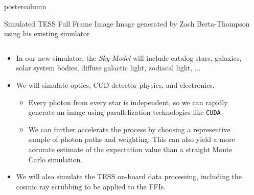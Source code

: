 \documentclass[final,hyperref={pdfpagelabels=false}]{beamer}
\newlength{\columnheight}
\begin{document}
\begin{frame}
\begin{columns}
    \begin{column}{.49\textwidth}
      \begin{beamercolorbox}[center,wd=\textwidth]{postercolumn}
        \begin{minipage}[T]{.95\textwidth}
          \parbox[t][\columnheight]{\textwidth}{
            \begin{block}{Simulated TESS Full Frame Image}
            Image generated by Zach Berta-Thompson using his existing simulator
              \begin{columns}
                \begin{column}{.60\textwidth}
                \begin{itemize}
                    \item In our new simulator, the \emph{Sky Model} will include catalog stars, galaxies, solar system bodies, diffuse galactic light, zodiacal light, ...
                    \vfill
                    \item We will simulate optics, CCD detector physics, and electronics.
                    \begin{itemize}
                    	\item Every photon from every star is independent, so we can rapidly generate an image using parallelization technologies like \texttt{CUDA} 
			\item We can further accelerate the process by choosing a representive sample of photon paths and weighting. This can also yield a more accurate estimate of the expectation value than a straight Monte Carlo simulation.
                    \end{itemize}
                    \vfill
                    \item We will also simulate the TESS on-board data processing, including the cosmic ray scrubbing to be applied to the FFIs.
                    \vfill
                \end{itemize}
                \end{column}
                \begin{column}{.38\textwidth}

\end{column}
\end{columns}
\end{block}}
\end{minipage}
\end{beamercolorbox}
\end{column}
\end{columns}
\end{frame}
\end{document}
